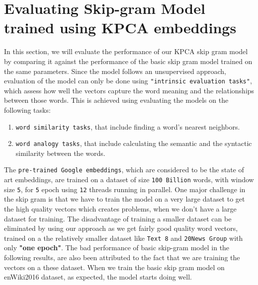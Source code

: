 \section{Evaluating Skip-gram Model trained using KPCA embeddings}
In this section, we will evaluate the performance of our KPCA skip gram model by comparing it against the performance of the basic skip gram model trained on the same parameters. Since the model follows an unsupervised approach, evaluation of the model can only be done using \texttt{"intrinsic evaluation tasks"}, which assess how well the vectors capture the word meaning and the relationships between those words. This is achieved using evaluating the models on the following tasks:
\begin{enumerate}
	\item \texttt{word similarity tasks}, that include finding a word's nearest neighbors.
	\item \texttt{word analogy tasks}, that include calculating the semantic and the syntactic similarity between the words.
\end{enumerate}
The \texttt{pre-trained Google embeddings}, which are considered to be the state of art embeddings, are trained on a dataset of size \texttt{100 Billion} words, with window size \texttt{5}, for \texttt{5} epoch using \texttt{12} threads running in parallel. One major challenge in the skip gram is that we have to train the model on a very large dataset to get the high quality vectors which creates problems, when we don't have a large dataset for training. The disadvantage of training a smaller dataset can  be eliminated by using our approach as we get fairly good quality word vectors, trained on a the relatively smaller dataset like \texttt{Text 8} and \texttt{20News Group} with only \textbf{"one epoch"}. The bad performance of basic skip-gram model in the following results, are  also been attributed to the fact that we are training the vectors on a these dataset. When we train the basic skip gram model on enWiki2016 dataset, as expected, the model starts doing well. 
